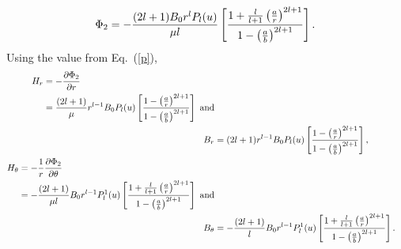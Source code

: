 \begin{equation}\label{p}
\Phi_2=-\frac{(2l+1)B_0r^lP_l(u)}{\mu l}\left[\frac{1+\frac{l}{l+1}\left(\frac{a}{r}\right)^{2l+1}}{1-\left(\frac{a}{b}\right)^{2l+1}}\right]{\rm .}
\end{equation}
Using the value from Eq.~(\ref{p}),
\begin{align}
    \begin{split}\label{Hr}
        H_r &=-\frac{\partial \Phi_2}{\partial r}\\
        &=\frac{(2l+1)}{\mu}r^{l-1}B_0P_l(u)\left[\frac{1-\left(\frac{a}{r}\right)^{2l+1}}{1-\left(\frac{a}{b}\right)^{2l+1}}\right]{\rm ~and}
    \end{split}\\
    B_r &=(2l+1)r^{l-1}B_0P_l(u)\left[\frac{1-\left(\frac{a}{r}\right)^{2l+1}}{1-\left(\frac{a}{b}\right)^{2l+1}}\right]{\rm ,}\label{Br}\\
    \begin{split}\label{Ht}
        H_\theta &=-\frac{1}{r}\frac{\partial \Phi_2}{\partial \theta}\\
         & =-\frac{(2l+1)}{\mu l}B_0r^{l-1}P_l^1(u)\left[
         \frac{1+\frac{l}{l+1}\left(\frac{a}{r}\right)^{2l+1}}
         {1-\left(\frac{a}{b}\right)^{2l+1}}
         \right]{\rm ~and}
    \end{split}\\
    B_\theta &=-\frac{(2l+1)}{l}B_0r^{l-1}P_l^1(u)\left[\frac{1+\frac{l}{l+1}\left(\frac{a}{r}\right)^{2l+1}}{1-\left(\frac{a}{b}\right)^{2l+1}}\right]{\rm .}\label{Bt}
\end{align}

